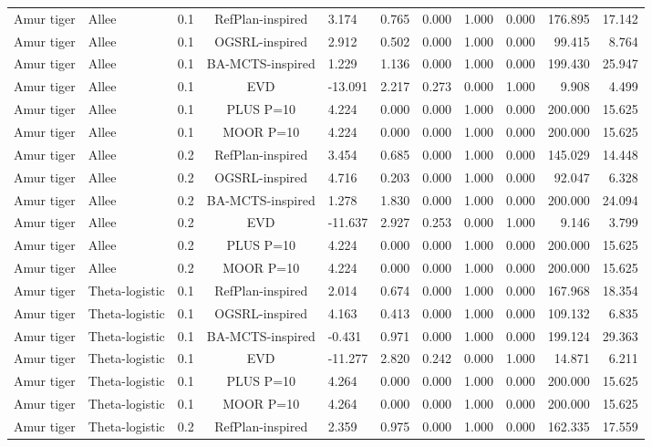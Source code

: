 \documentclass[10pt]{article}
\begin{document}
\begin{landscape}
\begin{center}
\begin{longtable}{@{}lllclrrrrrr@{}}
Amur tiger & Allee & 0.1 & RefPlan-inspired & 3.174 & 0.765 & 0.000 & 1.000 & 0.000 & 176.895 & 17.142 \\
Amur tiger & Allee & 0.1 & OGSRL-inspired & 2.912 & 0.502 & 0.000 & 1.000 & 0.000 & 99.415 & 8.764 \\
Amur tiger & Allee & 0.1 & BA-MCTS-inspired & 1.229 & 1.136 & 0.000 & 1.000 & 0.000 & 199.430 & 25.947 \\
Amur tiger & Allee & 0.1 & EVD & -13.091 & 2.217 & 0.273 & 0.000 & 1.000 & 9.908 & 4.499 \\
Amur tiger & Allee & 0.1 & PLUS P=10 & 4.224 & 0.000 & 0.000 & 1.000 & 0.000 & 200.000 & 15.625 \\
Amur tiger & Allee & 0.1 & MOOR P=10 & 4.224 & 0.000 & 0.000 & 1.000 & 0.000 & 200.000 & 15.625 \\
Amur tiger & Allee & 0.2 & RefPlan-inspired & 3.454 & 0.685 & 0.000 & 1.000 & 0.000 & 145.029 & 14.448 \\
Amur tiger & Allee & 0.2 & OGSRL-inspired & 4.716 & 0.203 & 0.000 & 1.000 & 0.000 & 92.047 & 6.328 \\
Amur tiger & Allee & 0.2 & BA-MCTS-inspired & 1.278 & 1.830 & 0.000 & 1.000 & 0.000 & 200.000 & 24.094 \\
Amur tiger & Allee & 0.2 & EVD & -11.637 & 2.927 & 0.253 & 0.000 & 1.000 & 9.146 & 3.799 \\
Amur tiger & Allee & 0.2 & PLUS P=10 & 4.224 & 0.000 & 0.000 & 1.000 & 0.000 & 200.000 & 15.625 \\
Amur tiger & Allee & 0.2 & MOOR P=10 & 4.224 & 0.000 & 0.000 & 1.000 & 0.000 & 200.000 & 15.625 \\
Amur tiger & Theta-logistic & 0.1 & RefPlan-inspired & 2.014 & 0.674 & 0.000 & 1.000 & 0.000 & 167.968 & 18.354 \\
Amur tiger & Theta-logistic & 0.1 & OGSRL-inspired & 4.163 & 0.413 & 0.000 & 1.000 & 0.000 & 109.132 & 6.835 \\
Amur tiger & Theta-logistic & 0.1 & BA-MCTS-inspired & -0.431 & 0.971 & 0.000 & 1.000 & 0.000 & 199.124 & 29.363 \\
Amur tiger & Theta-logistic & 0.1 & EVD & -11.277 & 2.820 & 0.242 & 0.000 & 1.000 & 14.871 & 6.211 \\
Amur tiger & Theta-logistic & 0.1 & PLUS P=10 & 4.264 & 0.000 & 0.000 & 1.000 & 0.000 & 200.000 & 15.625 \\
Amur tiger & Theta-logistic & 0.1 & MOOR P=10 & 4.264 & 0.000 & 0.000 & 1.000 & 0.000 & 200.000 & 15.625 \\
Amur tiger & Theta-logistic & 0.2 & RefPlan-inspired & 2.359 & 0.975 & 0.000 & 1.000 & 0.000 & 162.335 & 17.559 \\

\end{longtable}
\end{center}
\end{landscape}
\end{document}
